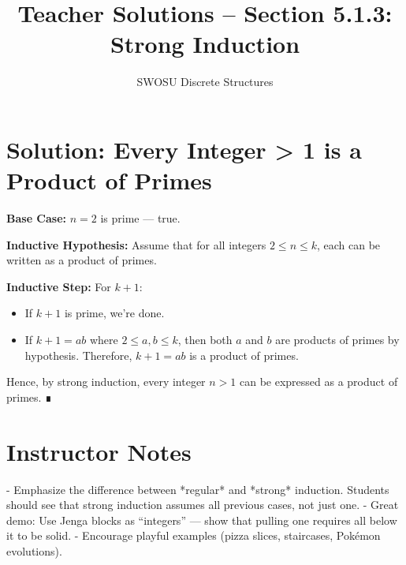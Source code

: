 \documentclass[12pt]{article}
\title{Teacher Solutions – Section 5.1.3: Strong Induction}
\author{SWOSU Discrete Structures}
\date{}
\begin{document}
\maketitle

\section*{Solution: Every Integer > 1 is a Product of Primes}

\textbf{Base Case:} \(n=2\) is prime — true.

\textbf{Inductive Hypothesis:}  
Assume that for all integers \(2\le n\le k\), each can be written as a product of primes.

\textbf{Inductive Step:}  
For \(k+1\):
\begin{itemize}
    \item If \(k+1\) is prime, we’re done.
    \item If \(k+1=ab\) where \(2\le a,b\le k\), then both \(a\) and \(b\) are products of primes by hypothesis.  
      Therefore, \(k+1=ab\) is a product of primes.
\end{itemize}

Hence, by strong induction, every integer \(n>1\) can be expressed as a product of primes. ∎

\section*{Instructor Notes}
- Emphasize the difference between *regular* and *strong* induction.  
  Students should see that strong induction assumes all previous cases, not just one.
- Great demo: Use Jenga blocks as “integers” — show that pulling one requires all below it to be solid.
- Encourage playful examples (pizza slices, staircases, Pokémon evolutions).
\end{document}
